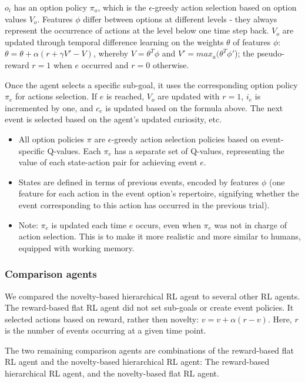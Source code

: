\documentclass{article}
\begin{document}
$o_i$ has an option policy $\pi_o$, which is the $\epsilon$-greedy action selection based on option values $V_o$. Features $\phi$ differ between options at different levels - they always represent the occurrence of actions at the level below one time step back. $V_o$ are updated through temporal difference learning on the weights $\theta$ of features $\phi$: $\theta = \theta + \alpha (r + \gamma V' - V)$, whereby $V = \theta^T \phi$ and $V' = max_a(\theta^T \phi'$); the pseudo-reward $r = 1$ when $e$ occurred and $r = 0$ otherwise. 

Once the agent selects a specific sub-goal, it uses the corresponding option policy $\pi_e$ for actions selection. If $e$ is reached, $V_o$ are updated with $r = 1$, $i_e$ is incremented by one, and $c_e$ is updated based on the formula above. The next event is selected based on the agent's updated curiosity, etc. 

\begin{itemize}
	\item All option policies $\pi$ are $\epsilon$-greedy action selection policies based on event-specific Q-values. Each $\pi_e$ has a separate set of Q-values, representing the value of each state-action pair for achieving event $e$. 
	\item States are defined in terms of previous events, encoded by features $\phi$ (one feature for each action in the event option's repertoire, signifying whether the event corresponding to this action has occurred in the previous trial).
	\item Note: $\pi_e$ is updated each time $e$ occurs, even when $\pi_e$ was not in charge of action selection. This is to make it more realistic and more similar to humans, equipped with working memory.
\end{itemize}

\subsubsection{Comparison agents}

We compared the novelty-based hierarchical RL agent to several other RL agents. The reward-based flat RL agent did not set sub-goals or create event policies. It selected actions based on reward, rather then novelty: $v = v + \alpha (r - v)$. Here, $r$ is the number of events occurring at a given time point. 

The two remaining comparison agents are combinations of the reward-based flat RL agent and the novelty-based hierarchical RL agent: The reward-based hierarchical RL agent, and the novelty-based flat RL agent.
\end{document}
